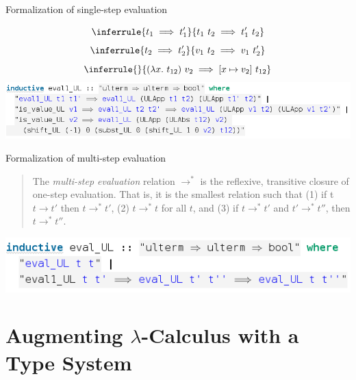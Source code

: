 \documentclass[xcolor=dvipsnames,notes]{beamer}
\begin{document}
\begin{frame}{Formalization of single-step evaluation}
  \begin{center}
    \small
    \begin{displaymath}
      \inferrule {t_1 \implies t_1'}{t_1 \ t_2 \implies t_1' \ t_2}
    \end{displaymath}
    \begin{displaymath}
      \inferrule {t_2 \implies t_2'}{v_1 \ t_2 \implies v_1 \ t_2'}
    \end{displaymath}
    \begin{displaymath}
      \inferrule {}{(\lambda x. \ t_{12}) \ v_2 \implies [x \mapsto v_2] \ t_{12}}
    \end{displaymath}
    \vspace{20pt}
    \includegraphics[scale=0.4]{eval1.png}
  \end{center}
\end{frame}

\begin{frame}{Formalization of multi-step evaluation}
  \begin{center}
    \small
    \begin{quotation}
      \noindent The \emph{multi-step evaluation} relation $\to^*$ is the reflexive, transitive closure
      of one-step evaluation. That is, it is the smallest relation such that (1) if t $t \to t'$ then
      $t \to^* t'$, (2) $t \to^* t$ for all $t$, and (3) if $t \to^* t'$ and $t' \to^* t''$, then
      $t \to^* t''$.
    \end{quotation}
    \vspace{20pt}
    \includegraphics[scale=0.4]{eval.png}
  \end{center}
\end{frame}

\section{Augmenting $\lambda$-Calculus with a Type System}
\end{document}
